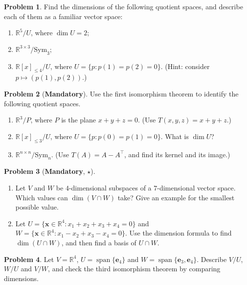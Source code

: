\documentclass[11pt]{article}
\theoremstyle{definition}
\newtheorem{problem}{Problem}[section]
\newcommand{\mandatory}{\textcolor{red!70!black}{\textbf{Mandatory}}}
\DeclareMathOperator{\Span}{span}
\begin{document}
\begin{problem}\label{pr:quotient-dim}
    Find the dimensions of the following quotient spaces, and describe each of them as a familiar vector space:
    \begin{enumerate}[label=(\alph*)]
        \item $\mathbb{R}^5/U$, where $\dim U = 2$;
        \item $\mathbb{R}^{3 \times 3}/\mathrm{Sym}_3$;
        \item $\mathbb{R}[x]_{\leq 4}/U$, where $U = \{p : p(1) = p(2) = 0\}$. (Hint: consider $p \mapsto (p(1), p(2))$.)
    \end{enumerate}
\end{problem}

\begin{problem}[\mandatory]\label{pr:first-iso}
    Use the first isomorphism theorem to identify the following quotient spaces.
    \begin{enumerate}[label=(\alph*)]
        \item $\mathbb{R}^3/P$, where $P$ is the plane $x + y + z = 0$. (Use $T(x, y, z) = x + y + z$.)
        \item $\mathbb{R}[x]_{\leq 3}/U$, where $U = \{p : p(0) = p(1) = 0\}$. What is $\dim U$?
        \item $\mathbb{R}^{n \times n}/\mathrm{Sym}_n$. (Use $T(A) = A - A^\top$, and find its kernel and its image.)
    \end{enumerate}
\end{problem}

\begin{problem}[\mandatory, $\star$]\label{pr:grassmann}
    \begin{enumerate}[label=(\alph*)]
        \item Let $V$ and $W$ be $4$-dimensional subspaces of a $7$-dimensional vector space. Which values can $\dim(V \cap W)$ take? Give an example for the smallest possible value.
        \item Let $U = \{\mathbf{x} \in \mathbb{R}^4 : x_1 + x_2 + x_3 + x_4 = 0\}$ and $W = \{\mathbf{x} \in \mathbb{R}^4 : x_1 - x_2 + x_3 - x_4 = 0\}$. Use the dimension formula to find $\dim(U \cap W)$, and then find a basis of $U \cap W$.
    \end{enumerate}
\end{problem}

\begin{problem}\label{pr:third-iso}
    Let $V = \mathbb{R}^4$, $U = \Span\{\mathbf{e}_4\}$ and $W = \Span\{\mathbf{e}_3, \mathbf{e}_4\}$. Describe $V/U$, $W/U$ and $V/W$, and check the third isomorphism theorem by comparing dimensions.
\end{problem}
\end{document}
